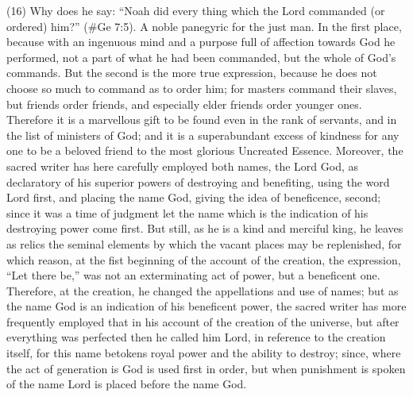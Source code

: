 (16) Why does he say: ``Noah did every thing which the Lord commanded (or ordered) him?''
(\#Ge 7:5). A noble panegyric for the just man. In the first place, because with an ingenuous
mind and a purpose full of affection towards God he performed, not a part of what he had been
commanded, but the whole of God's commands. But the second is the more true expression,
because he does not choose so much to command as to order him; for masters command their
slaves, but friends order friends, and especially elder friends order younger ones. Therefore it is a
marvellous gift to be found even in the rank of servants, and in the list of ministers of God; and it is
a superabundant excess of kindness for any one to be a beloved friend to the most glorious
Uncreated Essence. Moreover, the sacred writer has here carefully employed both names, the
Lord God, as declaratory of his superior powers of destroying and benefiting, using the word Lord
first, and placing the name God, giving the idea of beneficence, second; since it was a time of
judgment let the name which is the indication of his destroying power come first. But still, as he is a
kind and merciful king, he leaves as relics the seminal elements by which the vacant places may be
replenished, for which reason, at the fist beginning of the account of the creation, the expression,
``Let there be,'' was not an exterminating act of power, but a beneficent one. Therefore, at the
creation, he changed the appellations and use of names; but as the name God is an indication of
his beneficent power, the sacred writer has more frequently employed that in his account of the
creation of the universe, but after everything was perfected then he called him Lord, in reference
to the creation itself, for this name betokens royal power and the ability to destroy; since, where the
act of generation is God is used first in order, but when punishment is spoken of the name Lord is
placed before the name God.

